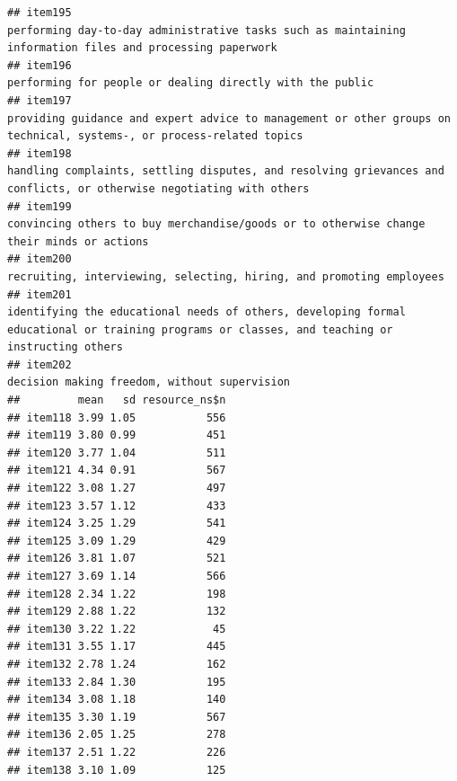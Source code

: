 \documentclass[
  man]{apa6}
\begin{document}
\begin{verbatim}
## item195                                                                                                                 performing day-to-day administrative tasks such as maintaining information files and processing paperwork
## item196                                                                                                                                                                 performing for people or dealing directly with the public
## item197                                                                                                      providing guidance and expert advice to management or other groups on technical, systems-, or process-related topics
## item198                                                                                                      handling complaints, settling disputes, and resolving grievances and conflicts, or otherwise negotiating with others
## item199                                                                                                                                  convincing others to buy merchandise/goods or to otherwise change their minds or actions
## item200                                                                                                                                                      recruiting, interviewing, selecting, hiring, and promoting employees
## item201                                                                            identifying the educational needs of others, developing formal educational or training programs or classes, and teaching or instructing others
## item202                                                                                                                                                                              decision making freedom, without supervision
##         mean   sd resource_ns$n
## item118 3.99 1.05           556
## item119 3.80 0.99           451
## item120 3.77 1.04           511
## item121 4.34 0.91           567
## item122 3.08 1.27           497
## item123 3.57 1.12           433
## item124 3.25 1.29           541
## item125 3.09 1.29           429
## item126 3.81 1.07           521
## item127 3.69 1.14           566
## item128 2.34 1.22           198
## item129 2.88 1.22           132
## item130 3.22 1.22            45
## item131 3.55 1.17           445
## item132 2.78 1.24           162
## item133 2.84 1.30           195
## item134 3.08 1.18           140
## item135 3.30 1.19           567
## item136 2.05 1.25           278
## item137 2.51 1.22           226
## item138 3.10 1.09           125

\end{verbatim}
\end{document}
